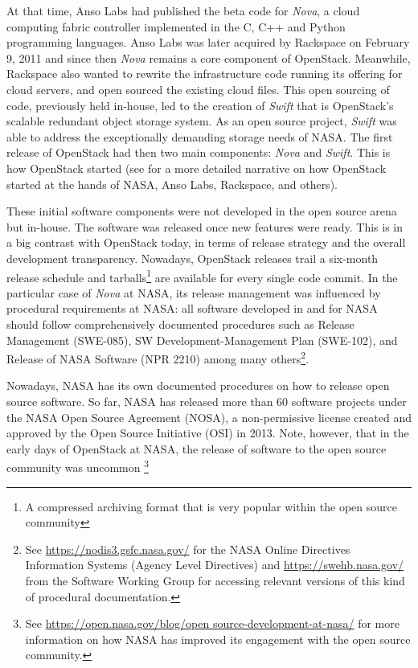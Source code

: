 \documentclass[dvipsnames]{interact}
\theoremstyle{plain}\newtheorem{theorem}{Theorem}[section]
\theoremstyle{definition}
\theoremstyle{remark}
\newcommand{\newPara}[1]{\textcolor{Sepia}{#1}}
\renewcommand{\newPara}[1]{#1}
\begin{document}
At that time,  Anso Labs had published the beta code for \textit{Nova}, a cloud computing fabric controller implemented in the C, C++ and Python programming languages.  Anso Labs was later acquired by Rackspace on February 9, 2011 and since then \textit{Nova} remains a core component of OpenStack. Meanwhile, Rackspace also wanted to rewrite the infrastructure code running its offering for cloud servers, and open sourced the existing cloud files. This open sourcing of code, previously held in-house,  led to the creation of \textit{Swift} that is OpenStack's scalable redundant object storage system. As an open source project, \textit{Swift} was able to address the exceptionally demanding storage needs of NASA. The first release of OpenStack had then two main components: \textit{Nova} and \textit{Swift}. This is how OpenStack started (see 
\cite{teixeira_and_Hyrynsalmi2017icsob} for a more detailed narrative on how OpenStack started at the hands of  NASA, Anso Labs, Rackspace, and others).

These initial software components were not developed in the open source arena but in-house. The software was released once new features were ready. This is in a big contrast with OpenStack today, in terms of release strategy and the overall development transparency.  Nowadays, OpenStack releases trail a six-month release schedule and tarballs\footnote{A compressed archiving format that is very popular within the open source community} are available for every single code commit. In the particular case of \textit{Nova} at NASA, its release management was influenced by procedural requirements at NASA: all software developed in and for NASA should follow comprehensively documented procedures such as  Release Management (SWE-085), SW Development-Management Plan (SWE-102),  and Release of NASA Software (NPR 2210) among many others\footnote{See \url{https://nodis3.gsfc.nasa.gov/} for the NASA Online Directives Information Systems (Agency Level Directives) and \url{https://swehb.nasa.gov/} from the Software Working Group for accessing relevant versions of this kind of procedural documentation.}.

\newPara{
Nowadays, NASA has its own documented procedures on how to release open source software. So far, NASA has released more than 60 software projects under the NASA Open Source Agreement (NOSA), a non-permissive license created and approved by the Open Source Initiative (OSI) in 2013.  Note, however, that in the early days of OpenStack at NASA, the release of software to the open source community was uncommon \footnote{See \url{https://open.nasa.gov/blog/open source-development-at-nasa/} for more information on how NASA has improved its engagement with the open source community.}
}
\end{document}

